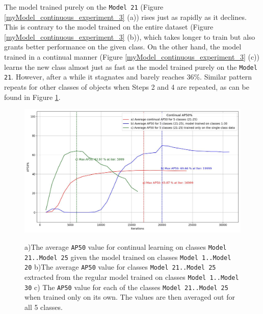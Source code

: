 The model trained purely on the \texttt{Model 21} (Figure \ref{myModel_continuous_experiment_3} (a))  rises just as rapidly as it declines. This is contrary to the model trained on the entire dataset (Figure \ref{myModel_continuous_experiment_3} (b)), which takes longer to train but also grants better performance on the given class. On the other hand, the model trained in a continual manner (Figure \ref{myModel_continuous_experiment_3} (c)) learns the new class almost just as fast as the model trained purely on the \texttt{Model 21}. However, after a while it stagnates and barely reaches 36\%. Similar pattern repeats for other classes of objects when Steps 2 and 4 are repeated, as can be found in Figure \ref{myModel_continuous_experiment_2}.

\begin{figure}[htb]
	\begin{center}
		\includegraphics[width=14cm]{./continualAP_average.jpg}
	\end{center}
	\caption{a)The average \texttt{AP50} value for continual learning on classes \texttt{Model 21..Model 25} given the model trained on classes \texttt{Model 1..Model 20}  b)The average \texttt{AP50} value for classes \texttt{Model 21..Model 25} extracted from the regular model trained on classes \texttt{Model 1..Model 30} c) The \texttt{AP50} value for each of the classes \texttt{Model 21..Model 25} when trained only on its own. The values are then averaged out for all 5 classes.}
	\begin{center}	\label{myModel_continuous_experiment_2}
	\end{center}
\end{figure}
\FloatBarrier
  
